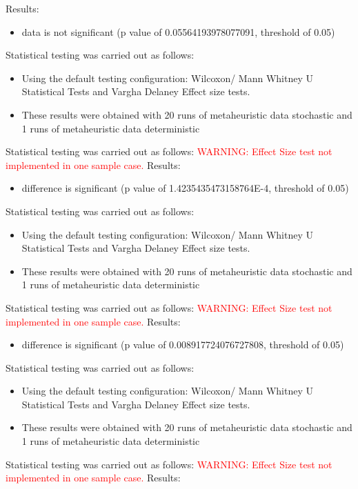 \documentclass[]{article}
\begin{document}
Results:
\begin{itemize}
\item{data is not significant (p value of 0.05564193978077091, threshold of 0.05)}
\end{itemize}Statistical testing was carried out as follows: \begin{itemize}
\item{Using the default testing configuration: Wilcoxon/ Mann Whitney U Statistical Tests and Vargha Delaney Effect size tests.}
\item{These results were obtained with 20 runs of metaheuristic data stochastic and 1 runs of metaheuristic data deterministic}
\end{itemize}Statistical testing was carried out as follows: 
\textcolor{Red}{WARNING: Effect Size test not implemented in one sample case.
}
Results:
\begin{itemize}
\item{difference is significant (p value of 1.4235435473158764E-4, threshold of 0.05)}
\end{itemize}Statistical testing was carried out as follows: \begin{itemize}
\item{Using the default testing configuration: Wilcoxon/ Mann Whitney U Statistical Tests and Vargha Delaney Effect size tests.}
\item{These results were obtained with 20 runs of metaheuristic data stochastic and 1 runs of metaheuristic data deterministic}
\end{itemize}Statistical testing was carried out as follows: 
\textcolor{Red}{WARNING: Effect Size test not implemented in one sample case.
}
Results:
\begin{itemize}
\item{difference is significant (p value of 0.008917724076727808, threshold of 0.05)}
\end{itemize}Statistical testing was carried out as follows: \begin{itemize}
\item{Using the default testing configuration: Wilcoxon/ Mann Whitney U Statistical Tests and Vargha Delaney Effect size tests.}
\item{These results were obtained with 20 runs of metaheuristic data stochastic and 1 runs of metaheuristic data deterministic}
\end{itemize}Statistical testing was carried out as follows: 
\textcolor{Red}{WARNING: Effect Size test not implemented in one sample case.
}
Results:
\end{document}
